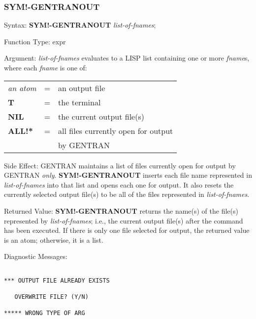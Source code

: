 \subsubsection{SYM!-GENTRANOUT} 
\begin{describe}{Syntax:}
{\bf SYM!-GENTRANOUT} {\it list-of-fnames\/};
\end{describe} 
\begin{describe}{Function Type:}
expr
\end{describe} 
\begin{describe}{Argument:}
{\it list-of-fnames\/} evaluates to a LISP list containing one or more
{\it fname\/}s, where each {\it fname} is one of:

\begin{tabular}{lll}
{\it an atom} & = & an output file\\
{\bf T} & = & the terminal\\
{\bf NIL} & = &  the current output file(s)\\
{\bf ALL!*} & = &  all files currently open for output \\
& &  by GENTRAN\\
\end{tabular}
\end{describe}
\begin{describe}{Side Effect:}
GENTRAN maintains a list of files currently open for output by GENTRAN
{\it only}.  {\bf SYM!-GENTRANOUT} inserts each file name represented in
{\it list-of-fnames\/} into that list and opens each one
for output.  It also resets the currently selected output file(s) to be
all of the files represented in {\it list-of-fnames}.
\end{describe} 
\begin{describe}{Returned Value:}
{\bf SYM!-GENTRANOUT} returns the name(s) of the file(s) represented
by {\it list-of-fnames\/}; i.e., the current output file(s) after the
command has been executed.  If there is only one file
selected for output, the returned value is an atom; otherwise, it is
a list.
\end{describe} 
\begin{describe}{Diagnostic Messages:}
\begin{verbatim}

*** OUTPUT FILE ALREADY EXISTS

   OVERWRITE FILE? (Y/N)

***** WRONG TYPE OF ARG
\end{verbatim}
\end{describe} 

